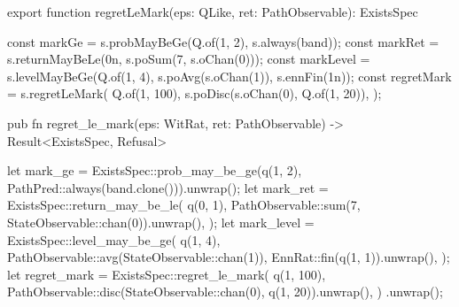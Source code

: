 \begin{tssrc}
export function regretLeMark(eps: QLike, ret: PathObservable): ExistsSpec
\end{tssrc}
\begin{tssrc}
const markGe = s.probMayBeGe(Q.of(1, 2), s.always(band));
const markRet = s.returnMayBeLe(0n, s.poSum(7, s.oChan(0)));
const markLevel = s.levelMayBeGe(Q.of(1, 4), s.poAvg(s.oChan(1)), s.ennFin(1n));
const regretMark = s.regretLeMark(
  Q.of(1, 100),
  s.poDisc(s.oChan(0), Q.of(1, 20)),
);
\end{tssrc}
\begin{rustsrc}
pub fn regret_le_mark(eps: WitRat, ret: PathObservable) -> Result<ExistsSpec, Refusal>
\end{rustsrc}
\begin{rustsrc}
let mark_ge = ExistsSpec::prob_may_be_ge(q(1, 2), PathPred::always(band.clone())).unwrap();
let mark_ret = ExistsSpec::return_may_be_le(
    q(0, 1),
    PathObservable::sum(7, StateObservable::chan(0)).unwrap(),
);
let mark_level = ExistsSpec::level_may_be_ge(
    q(1, 4),
    PathObservable::avg(StateObservable::chan(1)),
    EnnRat::fin(q(1, 1)).unwrap(),
);
let regret_mark = ExistsSpec::regret_le_mark(
    q(1, 100),
    PathObservable::disc(StateObservable::chan(0), q(1, 20)).unwrap(),
)
.unwrap();
\end{rustsrc}
